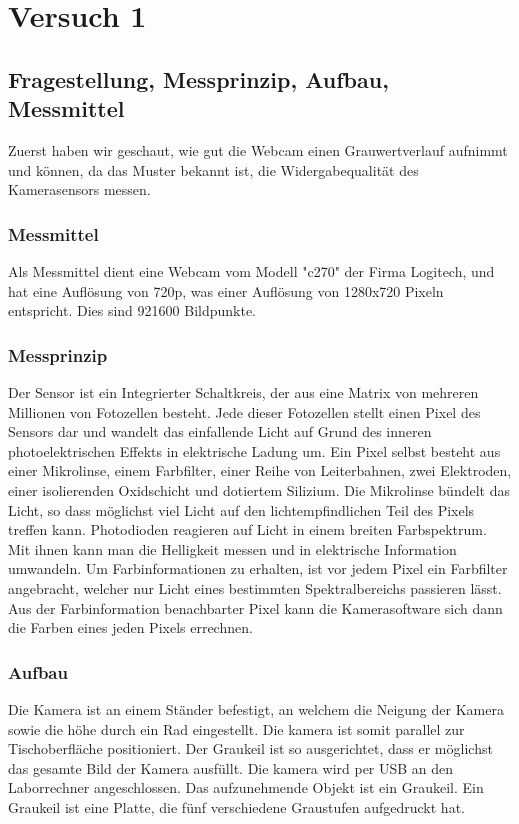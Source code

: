 \documentclass[TGAI_Laborbericht.tex]{subfiles}
\begin{document}
\chapter{Versuch 1}
\label{chap:VERSUCH_1}


\section{Fragestellung, Messprinzip, Aufbau, Messmittel}
\label{chap:VERSUCH_1_FRAGESTELLUNG}
Zuerst haben wir geschaut, wie gut die Webcam einen Grauwertverlauf aufnimmt und können, da das Muster bekannt ist, die Widergabequalität des Kamerasensors messen. 

\subsection{Messmittel}

Als Messmittel dient eine Webcam vom Modell "c270" der Firma Logitech, und hat eine Auflösung von 720p, was einer Auflösung von 1280x720 Pixeln entspricht. Dies sind 921600 Bildpunkte.

\subsection{Messprinzip}

Der Sensor ist ein Integrierter Schaltkreis, der aus eine Matrix von mehreren Millionen von Fotozellen besteht. Jede dieser Fotozellen stellt einen Pixel des Sensors dar und wandelt das einfallende Licht auf Grund des inneren photoelektrischen Effekts in elektrische Ladung um.
Ein Pixel selbst besteht aus einer Mikrolinse, einem Farbfilter, einer Reihe von Leiterbahnen, zwei Elektroden, einer isolierenden Oxidschicht und dotiertem Silizium.
Die Mikrolinse bündelt das Licht, so dass möglichst viel Licht auf den lichtempfindlichen Teil des Pixels treffen kann.
Photodioden reagieren auf Licht in einem breiten Farbspektrum. Mit ihnen kann man die Helligkeit messen und in elektrische Information umwandeln. Um Farbinformationen zu erhalten, ist vor jedem Pixel ein Farbfilter angebracht, welcher nur Licht eines bestimmten Spektralbereichs passieren lässt. Aus der Farbinformation benachbarter Pixel kann die Kamerasoftware sich dann die Farben eines jeden Pixels errechnen.

\subsection{Aufbau}
Die Kamera ist an einem Ständer befestigt, an welchem die Neigung der Kamera sowie die höhe durch ein Rad eingestellt. Die kamera ist somit parallel zur Tischoberfläche positioniert. Der Graukeil ist so ausgerichtet, dass er möglichst das gesamte Bild der Kamera ausfüllt. Die kamera wird per USB an den Laborrechner angeschlossen. Das aufzunehmende Objekt ist ein Graukeil. Ein Graukeil ist eine Platte, die fünf verschiedene Graustufen aufgedruckt hat.
\end{document}
